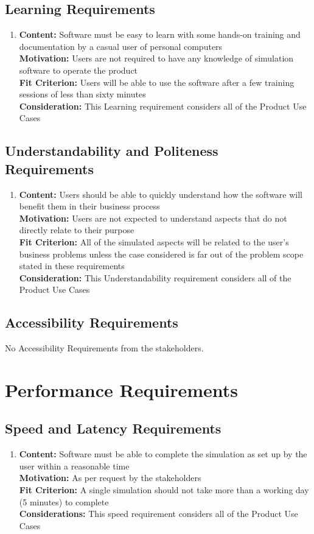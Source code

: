 \documentclass[paper=letter, fontsize=10pt]{scrartcl}
\numberwithin{equation}{section}		%
\numberwithin{figure}{section}			%
\numberwithin{table}{section}				%
\begin{document}
\subsection{Learning Requirements}
\begin{enumerate}
	\item \textbf{Content:} Software must be easy to learn with some hands-on training and documentation by a casual user of personal computers
	\\	  \textbf{Motivation:} Users are not required to have any knowledge of simulation software to operate the product
	\\	  \textbf{Fit Criterion:} Users will be able to use the software after a few training sessions of less than sixty minutes	\\	  \textbf{Consideration:} This Learning requirement considers all of the Product Use Cases
\end{enumerate}
\subsection{Understandability and Politeness Requirements}
\begin{enumerate}
	\item \textbf{Content:} Users should be able to quickly understand how the software will benefit them in their business process
	\\	  \textbf{Motivation:} Users are not expected to understand aspects that do not directly relate to their purpose
	\\	  \textbf{Fit Criterion:} All of the simulated aspects will be related to the user's business problems unless the case considered is far out of the problem scope stated in these requirements
	\\	  \textbf{Consideration:} This Understandability requirement considers all of the Product Use Cases	
\end{enumerate}
\subsection{Accessibility Requirements}
No Accessibility Requirements from the stakeholders.

\section{Performance Requirements}
\subsection{Speed and Latency Requirements}
\begin{enumerate}
	\item \textbf{Content:} Software must be able to complete the simulation as set up by the user within a reasonable time
	\\	  \textbf{Motivation:} As per request by the stakeholders
	\\	  \textbf{Fit Criterion:} A single simulation should not take more than a working day (5 minutes) to complete
	\\	  \textbf{Considerations:} This speed requirement considers all of the Product Use Cases
\end{enumerate}
\end{document}
